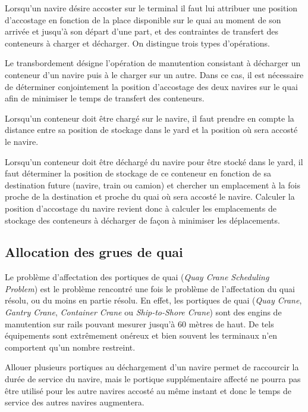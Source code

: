 Lorsqu'un navire désire accoster sur le terminal il faut lui attribuer une position d'accostage en fonction de la place disponible sur le quai au moment de son arrivée et jusqu'à son départ d'une part, et des contraintes de transfert des conteneurs à charger et décharger. On distingue trois types d'opérations.

Le transbordement désigne l'opération de manutention consistant à décharger un conteneur d'un navire puis à le charger sur un autre. Dans ce cas, il est nécessaire de déterminer conjointement la position d'accostage des deux navires sur le quai afin de minimiser le temps de transfert des conteneurs.

Lorsqu'un conteneur doit être chargé sur le navire, il faut prendre en compte la distance entre sa position de stockage dans le yard et la position où sera accosté le navire.

Lorsqu'un conteneur doit être déchargé du navire pour être stocké dans le yard, il faut déterminer la position de stockage de ce conteneur en fonction de sa destination future (navire, train ou camion) et chercher un emplacement à la fois proche de la destination et proche du quai où sera accosté le navire. Calculer la position d'accostage du navire revient donc à calculer les emplacements de stockage des conteneurs à décharger de façon à minimiser les déplacements.


\subsection{Allocation des grues de quai}

Le problème d'affectation des portiques de quai (\textit{Quay Crane Scheduling Problem}) est le problème rencontré une fois le problème de l'affectation du quai résolu, ou du moins en partie résolu. 
En effet, les portiques de quai (\textit{Quay Crane}, \textit{Gantry Crane}, \textit{Container Crane} ou \textit{Ship-to-Shore Crane}) sont des engins de manutention sur rails pouvant mesurer jusqu'à 60 mètres de haut. 
De tels équipements sont extrêmement onéreux et bien souvent les terminaux n'en comportent qu'un nombre restreint. 

Allouer plusieurs portiques au déchargement d'un navire permet de raccourcir la durée de service du navire, mais le portique supplémentaire affecté ne pourra pas être utilisé pour les autre navires accosté au même instant et donc le temps de service des autres navires augmentera.

